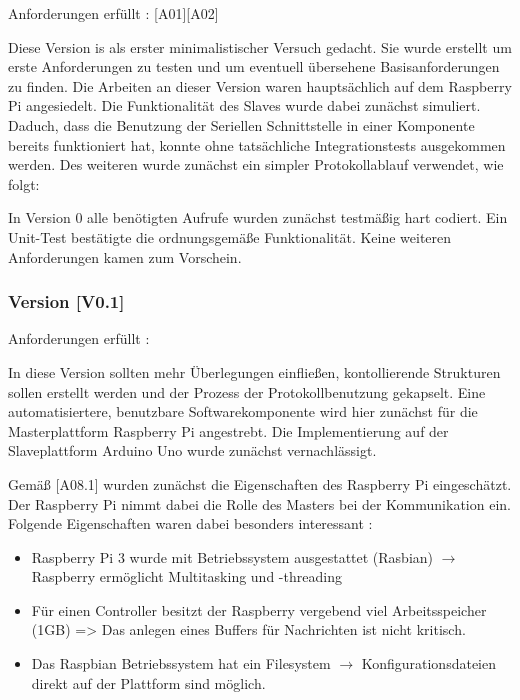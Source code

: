 Anforderungen erfüllt : [A01][A02]

Diese Version is als erster minimalistischer Versuch gedacht. Sie wurde erstellt um erste Anforderungen zu testen und um eventuell übersehene Basisanforderungen zu finden.
Die Arbeiten an dieser Version waren hauptsächlich auf dem Raspberry Pi angesiedelt.
Die Funktionalität des Slaves wurde dabei zunächst simuliert. Daduch, dass die Benutzung der Seriellen Schnittstelle in einer Komponente bereits funktioniert hat, konnte ohne tatsächliche Integrationstests ausgekommen werden.
Des weiteren wurde zunächst ein simpler Protokollablauf verwendet, wie folgt:

%

In Version 0 alle benötigten Aufrufe wurden zunächst testmäßig hart codiert.
Ein Unit-Test bestätigte die ordnungsgemäße Funktionalität.
Keine weiteren Anforderungen kamen zum Vorschein.

\subsubsection{Version [V0.1]}

Anforderungen erfüllt : 

In diese Version sollten mehr Überlegungen einfließen, kontollierende Strukturen sollen erstellt werden und der Prozess der Protokollbenutzung gekapselt.
Eine automatisiertere, benutzbare Softwarekomponente wird hier zunächst für die Masterplattform Raspberry Pi angestrebt.
 Die Implementierung auf der Slaveplattform Arduino Uno wurde zunächst vernachlässigt.

Gemäß [A08.1] wurden zunächst die Eigenschaften des Raspberry Pi eingeschätzt. Der Raspberry Pi nimmt dabei die Rolle des Masters bei der Kommunikation ein.
Folgende Eigenschaften waren dabei besonders interessant :

\begin{itemize}
	\item Raspberry Pi 3 wurde mit Betriebssystem ausgestattet (Rasbian) $ \rightarrow $ Raspberry ermöglicht Multitasking und -threading
	\item Für einen Controller besitzt der Raspberry vergebend viel Arbeitsspeicher (1GB) => Das anlegen eines Buffers für Nachrichten ist nicht kritisch.
	\item Das Raspbian Betriebssystem hat ein Filesystem $\rightarrow$ Konfigurationsdateien direkt auf der Plattform sind möglich.
\end{itemize}

